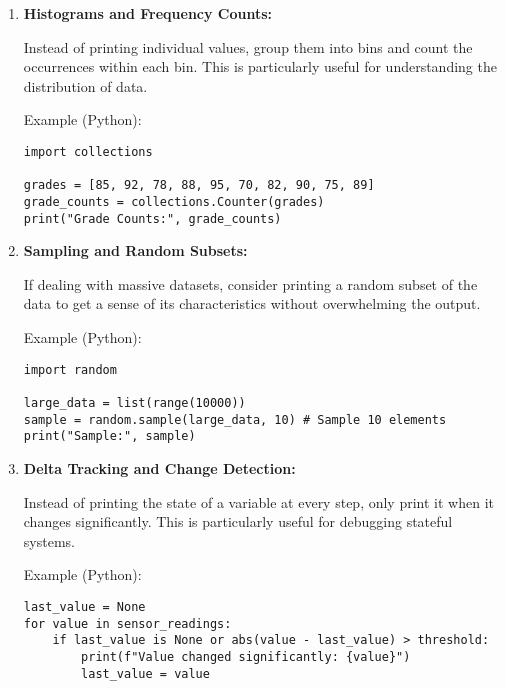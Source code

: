 \documentclass{article}
\begin{document}
{{{\begin{enumerate}
Example (Python):

\begin{verbatim}
import statistics

data = [random.random() for _ in range(1000)]
mean = statistics.mean(data)
stdev = statistics.stdev(data)
print(f"Mean: {mean:.4f}, Standard Deviation: {stdev:.4f}")
\end{verbatim}

\item \textbf{Histograms and Frequency Counts:}

Instead of printing individual values, group them into bins and count the occurrences within each bin. This is particularly useful for understanding the distribution of data.

Example (Python):

\begin{verbatim}
import collections

grades = [85, 92, 78, 88, 95, 70, 82, 90, 75, 89]
grade_counts = collections.Counter(grades)
print("Grade Counts:", grade_counts)
\end{verbatim}

\item \textbf{Sampling and Random Subsets:}

If dealing with massive datasets, consider printing a random subset of the data to get a sense of its characteristics without overwhelming the output.

Example (Python):

\begin{verbatim}
import random

large_data = list(range(10000))
sample = random.sample(large_data, 10) # Sample 10 elements
print("Sample:", sample)
\end{verbatim}

\item \textbf{Delta Tracking and Change Detection:}

Instead of printing the state of a variable at every step, only print it when it changes significantly. This is particularly useful for debugging stateful systems.

Example (Python):

\begin{verbatim}
last_value = None
for value in sensor_readings:
    if last_value is None or abs(value - last_value) > threshold:
        print(f"Value changed significantly: {value}")
        last_value = value
\end{verbatim}


\end{enumerate}}}}
\end{document}
